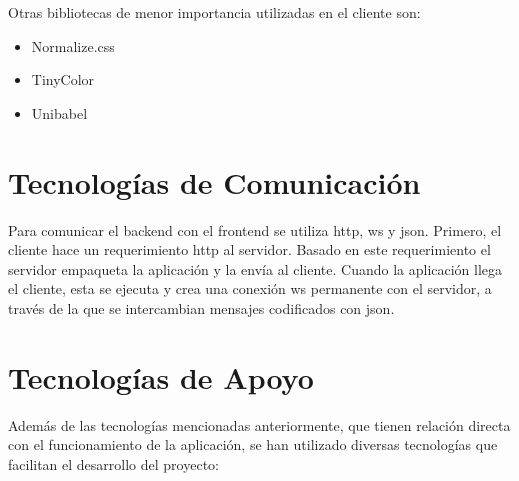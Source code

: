 Otras bibliotecas de menor importancia utilizadas en el \gls{cliente}
son:

\begin{itemize}
\itemsep1pt\parskip0pt
\item
  Normalize.css
\item
  TinyColor
\item
  Unibabel
\end{itemize}

\section{Tecnologías de
Comunicación}\label{tecnologuxedas-de-comunicaciuxf3n}

Para comunicar el \gls{backend} con el \gls{frontend} se utiliza
\gls{http}, \gls{ws} y \gls{json}. Primero, el \gls{cliente} hace un
requerimiento \gls{http} al \gls{servidor}. Basado en este requerimiento
el \gls{servidor} empaqueta la aplicación y la envía al \gls{cliente}.
Cuando la aplicación llega el \gls{cliente}, esta se ejecuta y crea una
conexión \gls{ws} permanente con el \gls{servidor}, a través de la que
se intercambian mensajes codificados con \gls{json}.

\section{Tecnologías de Apoyo}\label{tecnologuxedas-de-apoyo}

Además de las tecnologías mencionadas anteriormente, que tienen relación
directa con el funcionamiento de la aplicación, se han utilizado
diversas tecnologías que facilitan el desarrollo del proyecto:

